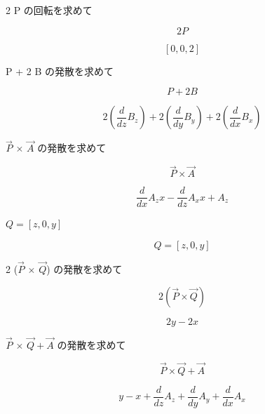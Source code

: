 \documentclass[dvipdfmx,a4paper,11pt]{jsarticle}
\begin{document}
2 P の回転を求めて

\begin{equation}
  2 P
  \label{eq:E45}
\end{equation}

\begin{equation}
  \left[ 0 , 0 , 2 \right]
  \label{eq:E46}
\end{equation}

P + 2 B の発散を求めて

\begin{equation}
  P + 2 B
  \label{eq:E47}
\end{equation}

\begin{equation}
  2 \left(\frac{d}{d z} B_{z}\right)+2 \left(\frac{d}{d y} B_{y}\right)+2 \left(\frac{d}{d x} B_{x}\right)
  \label{eq:E48}
\end{equation}

$\vec{P}$ $\times$ $\vec{A}$ の発散を求めて

\begin{equation}
  \vec{P} \times \vec{A}
  \label{eq:E49}
\end{equation}

\begin{equation}
  \frac{d}{d x} A_{z} x-\frac{d}{d z} A_{x} x+A_{z}
  \label{eq:E50}
\end{equation}

$Q = [z, 0, y]$

\begin{equation}
  Q = [z, 0, y]
  \label{eq:E51}
\end{equation}

2 ($\vec{P}$ $\times$ $\vec{Q}$) の発散を求めて

\begin{equation}
  2 (\vec{P} \times \vec{Q})
  \label{eq:E52}
\end{equation}

\begin{equation}
  2 y-2 x
  \label{eq:E53}
\end{equation}

$\vec{P}$ $\times$ $\vec{Q} + \vec{A}$ の発散を求めて

\begin{equation}
  \vec{P} \times \vec{Q} + \vec{A}
  \label{eq:E54}
\end{equation}

\begin{equation}
  y-x+\frac{d}{d z} A_{z}+\frac{d}{d y} A_{y}+\frac{d}{d x} A_{x}
  \label{eq:E55}
\end{equation}
\end{document}
